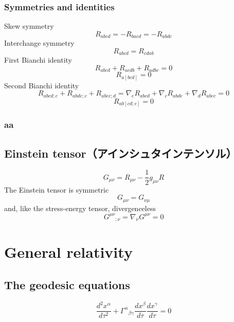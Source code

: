 \subsubsection{Symmetries and identities}
Skew symmetry
\[ R_{abcd} = -R_{bacd} = -R_{abdc} \]
Interchange symmetry
\[ R_{abcd} = R_{cdab} \]
First Bianchi identity
\[ R_{abcd} + R_{acdb} + R_{adbc} = 0 \]
\[ R_{a \left[ bcd \right] } = 0 \]
Second Bianchi identity
\[ R_{abcd;e} + R_{abde;c} + R_{abec;d} = \nabla_e R_{abcd} + \nabla_c R_{abde} + \nabla_d R_{abec} = 0 \]
\[ R_{ab \left[ cd;e \right] } = 0 \]

\subsubsection{aa}


%
%
\subsection{Einstein tensor（アインシュタインテンソル）}
\begin{equation}
  G_{\mu \nu} = R_{\mu \nu} - \frac{1}{2} g_{\mu \nu} R
\end{equation}
The Einstein tensor is symmetric
\begin{equation}
  G_{\mu \nu } = G_{\nu \mu }
\end{equation}
and, like the stress-energy tensor, divergenceless
\begin{equation}
  {G^{\mu \nu }}_{;\nu } = {\nabla }_{\nu } G^{\mu \nu } = 0
\end{equation}



%
%
%
%
%
\section{General relativity}



%
%
\subsection{The geodesic equations}
\begin{equation}
  \frac{d^2 x^\alpha }{d\tau^2} + {\Gamma^\alpha }_{\beta \gamma } \frac{dx^\beta }{d\tau } \frac{dx^\gamma }{d\tau } = 0
\end{equation}


